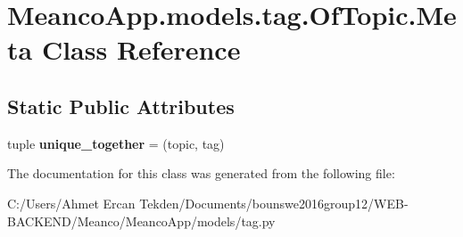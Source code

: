 \hypertarget{class_meanco_app_1_1models_1_1tag_1_1_of_topic_1_1_meta}{}\section{Meanco\+App.\+models.\+tag.\+Of\+Topic.\+Meta Class Reference}
\label{class_meanco_app_1_1models_1_1tag_1_1_of_topic_1_1_meta}
\subsection*{Static Public Attributes}
\begin{DoxyCompactItemize}
\item 
\hypertarget{class_meanco_app_1_1models_1_1tag_1_1_of_topic_1_1_meta_a1f5b41b9a15c21966af266a674e5328f}{}\label{class_meanco_app_1_1models_1_1tag_1_1_of_topic_1_1_meta_a1f5b41b9a15c21966af266a674e5328f} 
tuple {\bfseries unique\+\_\+together} = (\textquotesingle{}topic\textquotesingle{}, \textquotesingle{}tag\textquotesingle{})
\end{DoxyCompactItemize}


The documentation for this class was generated from the following file\+:\begin{DoxyCompactItemize}
\item 
C\+:/\+Users/\+Ahmet Ercan Tekden/\+Documents/bounswe2016group12/\+W\+E\+B-\/\+B\+A\+C\+K\+E\+N\+D/\+Meanco/\+Meanco\+App/models/tag.\+py\end{DoxyCompactItemize}
